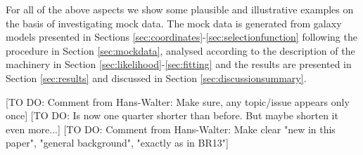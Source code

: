 For all of the above aspects we show some plausible and illustrative examples on the basis of investigating mock data. The mock data is generated from galaxy models presented in Sections \ref{sec:coordinates}-\ref{sec:selectionfunction} following the procedure in Section \ref{sec:mockdata}, analysed according to the description of the machinery in Section \ref{sec:likelihood}-\ref{sec:fitting} and the results are presented in Section \ref{sec:results} and discussed in Section \ref{sec:discussionsummary}.

[TO DO: Comment from Hans-Walter: Make sure, any topic/issue appears only once]
[TO DO: Is now one quarter shorter than before. But maybe shorten it even more...]
[TO DO: Comment from Hans-Walter: Make clear "new in this paper", "general background", "exactly as in BR13"]